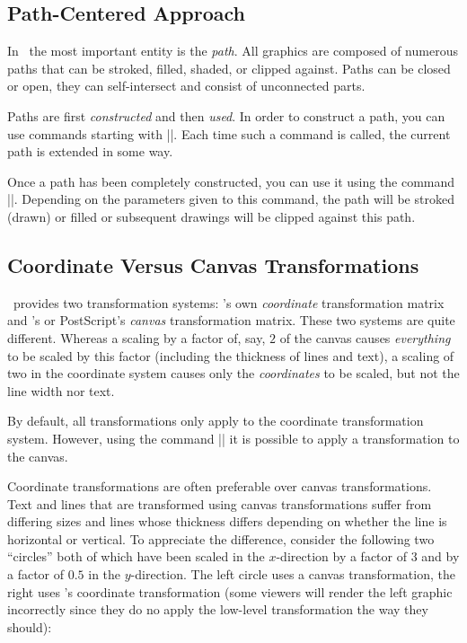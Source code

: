 \subsection{Path-Centered Approach}

In \pgfname\ the most important entity is the \emph{path}. All
graphics are composed of numerous paths that can be stroked,
filled, shaded, or clipped against. Paths can be closed or open, they
can self-intersect and consist of unconnected parts.

Paths are first \emph{constructed} and then \emph{used}. In order to
construct a path, you can use commands starting with |\pgfpath|. Each
time such a command is called, the current path is extended in some
way.

Once a path has been completely constructed, you can use it using the
command |\pgfusepath|. Depending on the parameters given to this
command, the path will be stroked (drawn) or filled or subsequent
drawings will be clipped against this path.




\subsection{Coordinate Versus Canvas Transformations}

\label{section-design-transformations}

\pgfname\ provides two transformation systems: \pgfname's own
\emph{coordinate} transformation matrix and \pdf's or PostScript's
\emph{canvas} transformation matrix. These two systems are quite
different. Whereas a scaling by a factor of, say, $2$ of the canvas
causes \emph{everything} to be scaled by this factor (including
the thickness of lines and text), a scaling of two in the coordinate 
system causes only the \emph{coordinates} to be scaled, but not the
line width nor text.

By default, all transformations only apply to the coordinate
transformation system. However, using the command |\pgflowlevel|
it is possible to apply a transformation to the canvas.

Coordinate transformations are often preferable over canvas
transformations. Text and lines that are transformed using canvas 
transformations suffer from differing sizes and lines whose thickness 
differs depending on whether the line is horizontal or vertical. To
appreciate the difference, consider the following two ``circles'' both
of which have been scaled in the $x$-direction by a factor of $3$ and
by a factor of $0.5$ in the $y$-direction. The left circle uses a
canvas transformation, the right uses \pgfname's coordinate
transformation (some viewers will render the left graphic incorrectly
since they do no apply the low-level transformation the way they
should):  

